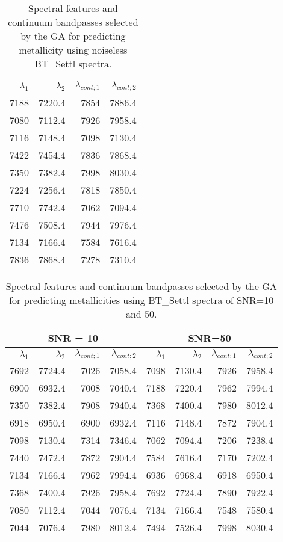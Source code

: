 \begin{table}
\begin{center}
\begin{tabular}{rrrr}
  \hline
  $\lambda_1$ & $\lambda_2$ & $\lambda_{cont;1}$ & $\lambda_{cont;2} $ \\ 
  \hline
7188 & 7220.4 &	7854 & 7886.4 \\ 
7080 & 7112.4 &	7926 & 7958.4 \\
7116 & 7148.4 &	7098 & 7130.4 \\
7422 & 7454.4 &	7836 & 7868.4 \\
7350 & 7382.4 &	7998 & 8030.4 \\
7224 & 7256.4 &	7818 & 7850.4 \\
7710 & 7742.4 &	7062 & 7094.4 \\
7476 & 7508.4 &	7944 & 7976.4 \\
7134 & 7166.4 &	7584 & 7616.4 \\
7836 & 7868.4 &	7278 & 7310.4 \\
\hline
\end{tabular}
\caption {Spectral features and continuum bandpasses
selected by the GA for predicting metallicity using noiseless
BT\_Settl spectra.} \label{tab:tab_SNRoo_M}
\end{center}
\end{table}

\begin{table*}
\begin{center}
\begin{tabular}{rrrr | rrrr}
  \hline
 \multicolumn{4}{c}{SNR = 10} &  \multicolumn{4}{c}{SNR=50} \\
  \hline
$\lambda_1$ & $\lambda_2$ & $\lambda_{cont;1}$ & $\lambda_{cont;2} $ & $\lambda_1$ & $\lambda_2$ & $\lambda_{cont;1}$ & $\lambda_{cont;2} $ \\ 
  \hline
7692 & 7724.4 &	7026 & 7058.4  &  7098 & 7130.4 & 7926 & 7958.4 \\
6900 & 6932.4 &	7008 & 7040.4  &  7188 & 7220.4 & 7962 & 7994.4  \\
7350 & 7382.4 &	7908 & 7940.4  &  7368 & 7400.4 & 7980 & 8012.4  \\
6918 & 6950.4 &	6900 & 6932.4  &  7116 & 7148.4 & 7872 & 7904.4  \\
7098 & 7130.4 &	7314 & 7346.4  &  7062 & 7094.4 & 7206 & 7238.4  \\
7440 & 7472.4 &	7872 & 7904.4  &  7584 & 7616.4 & 7170 & 7202.4  \\
7134 & 7166.4 &	7962 & 7994.4  &  6936 & 6968.4 & 6918 & 6950.4  \\
7368 & 7400.4 &	7926 & 7958.4  &  7692 & 7724.4 & 7890 & 7922.4  \\
7080 & 7112.4 &	7044 & 7076.4  &  7134 & 7166.4 & 7548 & 7580.4  \\
7044 & 7076.4 &	7980 & 8012.4  &  7494 & 7526.4 & 7998 & 8030.4  \\
\hline
\end{tabular}
\caption {Spectral features and continuum bandpasses
selected by the GA for predicting metallicities using BT\_Settl
spectra of SNR=10 and 50.} \label{tab:tab_SNR1050_G}
\end{center}
\end{table*}

